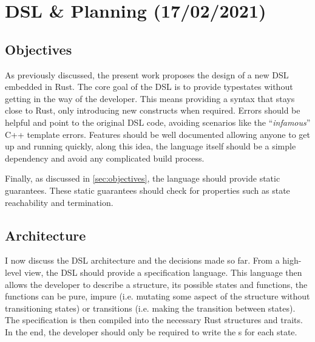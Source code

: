 \chapter{DSL \& Planning (17/02/2021)}\label{cha:planning}


\section{Objectives}

As previously discussed, the present work proposes the design of a new DSL embedded in Rust.
The core goal of the DSL is to provide typestates without getting in the way of the developer.
This means providing a syntax that stays close to Rust, only introducing new constructs when required.
Errors should be helpful and point to the original DSL code, avoiding scenarios like the “\emph{infamous}” C++ template errors.
Features should be well documented allowing anyone to get up and running quickly,
along this idea, the language itself should be a simple dependency and avoid any complicated build process.

Finally, as discussed in \autoref{sec:objectives}, the language should provide static guarantees.
These static guarantees should check for properties such as state reachability and termination.

\section{Architecture}\label{sec:arch}

I now discuss the DSL architecture and the decisions made so far.
From a high-level view, the DSL should provide a specification language.
This language then allows the developer to describe a structure, its possible states and functions,
the functions can be pure, impure (i.e. mutating some aspect of the structure without transitioning states)
or transitions (i.e. making the transition between states).
The specification is then compiled into the necessary Rust structures and traits.
In the end, the developer should only be required to write the s for each state.

